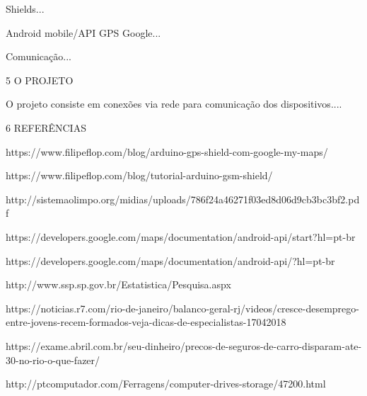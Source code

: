 \documentclass[12pt,a4paper]{article}
\begin{document}
Shields...

Android mobile/API GPS Google...

Comunicação...

5 O PROJETO

	O projeto consiste em conexões via rede para comunicação dos dispositivos....


6 REFERÊNCIAS

https://www.filipeflop.com/blog/arduino-gps-shield-com-google-my-maps/

https://www.filipeflop.com/blog/tutorial-arduino-gsm-shield/

http://sistemaolimpo.org/midias/uploads/786f24a46271f03ed8d06d9cb3bc3bf2.pdf

https://developers.google.com/maps/documentation/android-api/start?hl=pt-br

https://developers.google.com/maps/documentation/android-api/?hl=pt-br

http://www.ssp.sp.gov.br/Estatistica/Pesquisa.aspx

https://noticias.r7.com/rio-de-janeiro/balanco-geral-rj/videos/cresce-desemprego-entre-jovens-recem-formados-veja-dicas-de-especialistas-17042018

https://exame.abril.com.br/seu-dinheiro/precos-de-seguros-de-carro-disparam-ate-30-no-rio-o-que-fazer/

http://ptcomputador.com/Ferragens/computer-drives-storage/47200.html
\end{document}

